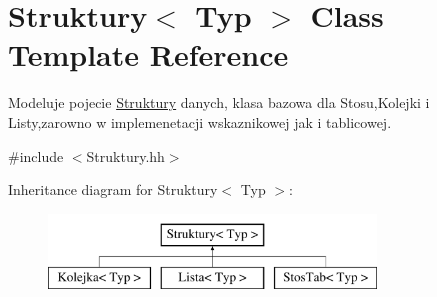 \hypertarget{class_struktury}{\section{Struktury$<$ Typ $>$ Class Template Reference}
\label{class_struktury}
}


Modeluje pojecie \hyperlink{class_struktury}{Struktury} danych, klasa bazowa dla Stosu,Kolejki i Listy,zarowno w implemenetacji wskaznikowej jak i tablicowej.  




{\ttfamily \#include $<$Struktury.\-hh$>$}

Inheritance diagram for Struktury$<$ Typ $>$\-:\begin{figure}[H]
\begin{center}
\leavevmode
\includegraphics[height=2.000000cm]{class_struktury}
\end{center}
\end{figure}
